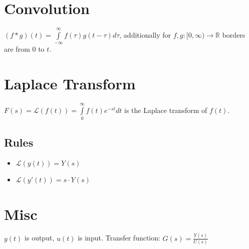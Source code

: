 \documentclass[10pt,a4paper]{article}
\begin{document}
\section*{Convolution}
$(f*g)(t) = \int\limits_{-\infty}^\infty f(\tau) g(t-\tau) d\tau$, additionally for $f, g : [0, \infty) \rightarrow \mathbb{R}$ borders are from $0$ to $t$.

\section*{Laplace Transform}
$F(s) = \mathcal{L}(f(t)) = \int\limits_0^\infty f(t) e^{-st} dt$ is the Laplace transform of $f(t)$.

\subsection{Rules}
\begin{itemize}
\item $\mathcal{L}(y(t)) = Y(s)$
\item $\mathcal{L}(y'(t)) = s \cdot Y(s)$
\end{itemize}

\section*{Misc}
$y(t)$ is output, $u(t)$ is input. Transfer function: $G(s) = \frac{Y(s)}{U(s)}$
\end{document}

